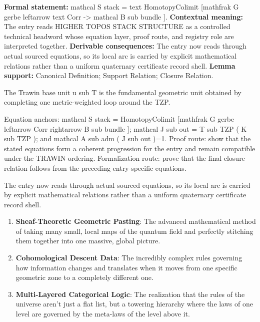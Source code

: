 \begingroup\footnotesize\setlength{\emergencystretch}{3em}\sloppy
\textbf{Formal statement:} mathcal S stack = text HomotopyColimit [mathfrak G gerbe leftarrow text Corr -> mathcal B sub bundle ]. \textbf{Contextual meaning:} The entry reads HIGHER TOPOS STACK STRUCTURE as a controlled technical headword whose equation layer, proof route, and registry role are interpreted together. \textbf{Derivable consequences:} The entry now reads through actual sourced equations, so its local arc is carried by explicit mathematical relations rather than a uniform quaternary certificate record shell. \textbf{Lemma support:} Canonical Definition; Support Relation; Closure Relation.\par
\endgroup

The Trawin base unit u sub T is the fundamental geometric unit obtained by completing one metric-weighted loop around the TZP.

Equation anchors: mathcal S stack = HomotopyColimit [mathfrak G gerbe leftarrow Corr rightarrow B sub bundle ]; mathcal J sub out = T sub TZP ( K sub TZP ); and mathcal A sub adm ( J sub out )=1. Proof route: show that the stated equations form a coherent progression for the entry and remain compatible under the TRAWIN ordering. Formalization route: prove that the final closure relation follows from the preceding entry-specific equations.

The entry now reads through actual sourced equations, so its local arc is carried by explicit mathematical relations rather than a uniform quaternary certificate record shell.
\endgroup

\begin{enumerate}[leftmargin=1.6em,itemsep=6pt,topsep=4pt]
\item \textbf{Sheaf-Theoretic Geometric Pasting}: The advanced mathematical method of taking many small, local maps of the quantum field and perfectly stitching them together into one massive, global picture.
\item \textbf{Cohomological Descent Data}: The incredibly complex rules governing how information changes and translates when it moves from one specific geometric zone to a completely different one.
\item \textbf{Multi-Layered Categorical Logic}: The realization that the rules of the universe aren't just a flat list, but a towering hierarchy where the laws of one level are governed by the meta-laws of the level above it.
\end{enumerate}

